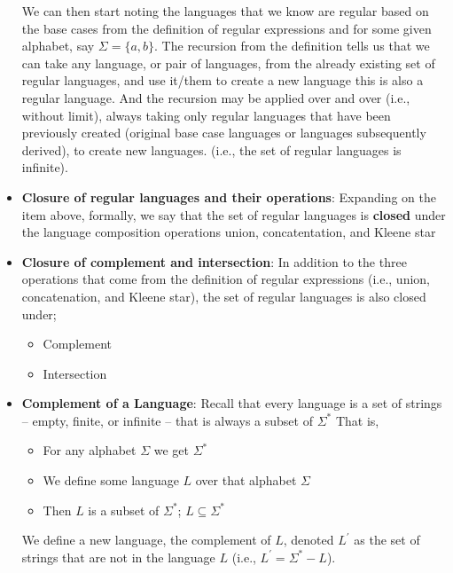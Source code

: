 \documentclass{report}
\begin{document}
\begin{itemize}
            \bigbreak \noindent 
            We can then start noting the languages that we know are regular based on the base cases from the definition of regular expressions and for some given alphabet, say $\Sigma = \{a, b\}$.
            \bigbreak \noindent 
            The recursion from the definition tells us that we can take any language, or pair of languages, from the already existing set of regular languages, and use it/them to create a new language this is also a regular language. And the recursion may be applied over and over (i.e., without limit), always taking only regular languages that have been previously created (original base case languages or languages subsequently derived), to create new languages. (i.e., the set of regular languages is infinite).
            \bigbreak \noindent 
        \item \textbf{Closure of regular languages and their operations}: Expanding on the item above, formally, we say that the set of regular languages is \textbf{closed} under the language composition operations union, concatentation, and Kleene star
        \item \textbf{Closure of complement and intersection}: In addition to the three operations that come from the definition of regular expressions (i.e., union, concatenation, and Kleene star), the set of regular languages is also closed under;
            \begin{itemize}
                \item Complement
                \item Intersection
            \end{itemize}
        \item \textbf{Complement of a Language}: Recall that every language is a set of strings – empty, finite, or infinite – that is always a subset of $\Sigma^{*}$
            \bigbreak \noindent 
            That is,
            \begin{itemize}
                \item For any alphabet $\Sigma$ we get $\Sigma^{*} $
                \item We define some language $L$ over that alphabet $\Sigma$
                \item Then $L$ is a subset of $\Sigma^{*}$; $L \subseteq \Sigma^{*}$
            \end{itemize}
            \bigbreak \noindent 
            We define a new language, the complement of $L$, denoted $L^{\prime}$ as the set of strings that are not in the language $L$ (i.e., $L^{\prime} = \Sigma^{*}  - L$).

\end{itemize}
\end{document}
